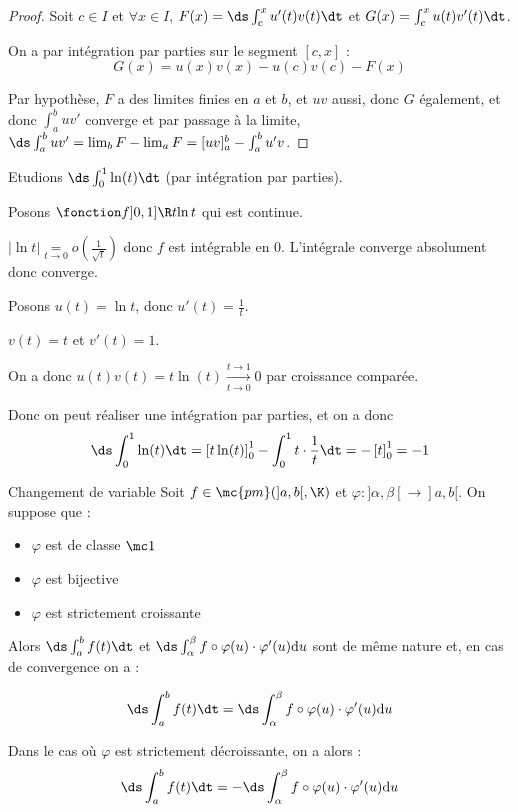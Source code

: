 \begin{proof}
    Soit $c \in I$ et $\forall x \in I$, $F(x) = \ds \int_c^x u'(t) v(t) \dt$ et 
    $G(x) = \int_c^x u(t) v'(t) \dt$.

    On a par intégration par parties sur le segment $[c, x]$ :
    $$ G(x) = u(x) v(x) - u(c) v(c) - F(x) $$

    Par hypothèse, $F$ a des limites finies en $a$ et $b$, et $uv$ aussi, donc $G$ également, et donc 
    $\int_{a }^{b } uv'$ converge et par passage à la limite, $\ds \int_{a }^{b } uv' = \lim_b F - \lim_a F = [uv]_a^b - \int_a^b u'v$.
\end{proof}

\begin{exemple}
    Etudions $\ds \int_{0}^{1 } \ln(t) \dt$ (par intégration par parties).

    Posons $\fonction f {]0, 1]}{\R}{t}{\ln t}$ qui est continue. 

    $|\ln t | \underset{t \to 0}{=} o \left( \frac 1 {\sqrt t} \right)$ donc $f$ est intégrable en $0$.
    L'intégrale converge absolument donc converge. 

    Posons $u(t) = \ln t$, donc $u'(t) = \frac 1 t$.

    $v(t) = t$ et $v'(t) = 1$.

    On a donc $u(t) v(t) = t \ln (t) \xrightarrow[t \to 0]{t \to 1} 0$ par croissance comparée.

    Donc on peut réaliser une intégration par parties, et on a donc 
    $$\ds \int_{0}^{1} \ln(t) \dt = \left[ t \ln (t) \right]_0^1 - \int_0^1 t \cdot \frac 1 t \dt = - \left[ t \right]_0^1 = -1$$
\end{exemple}

\begin{theoreme}{Changement de variable}{}
    Soit $f \in \mc {pm} (]a, b[, \K)$ et $\varphi : ]\alpha, \beta[ \to ]a, b[$. 
    On suppose que : 
    \begin{itemize}
        \item $\varphi$ est de classe $\mc 1$ 
        \item $\varphi$ est bijective
        \item $\varphi$ est strictement croissante
    \end{itemize}

    Alors $\ds \int_{a }^{b } f(t) \dt$ et $\ds \int_{\alpha }^{\beta } f \circ \varphi(u) \cdot \varphi'(u) \mathrm d u$ 
    sont de même nature et, en cas de convergence on a :
    
    $$\ds \int_{a }^{b } f(t) \dt = \ds \int_{\alpha }^{\beta } f \circ \varphi(u) \cdot \varphi'(u) \mathrm d u$$

    Dans le cas où $\varphi$ est strictement décroissante, on a alors : 
    $$\ds \int_{a }^{b } f(t) \dt = - \ds \int_{\alpha }^{\beta } f \circ \varphi(u) \cdot \varphi'(u) \mathrm d u$$
\end{theoreme}

